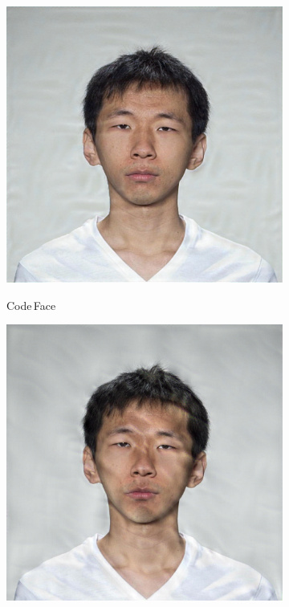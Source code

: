 \begin{figure}[ht]
\begin{subfigure}[t]{0.22\textwidth}
        \includegraphics[width=\textwidth]{images/005_CodeFace_1.4.jpg}\\
        \caption{Code\,Face}\label{fig:steganography_b}
    \end{subfigure}
    \hfill
    \begin{subfigure}[t]{0.22\textwidth}
        \centering
        \includegraphics[width=\textwidth]{images/005_RiemStega_1.4.jpg}\\

\end{subfigure}
\end{figure}
